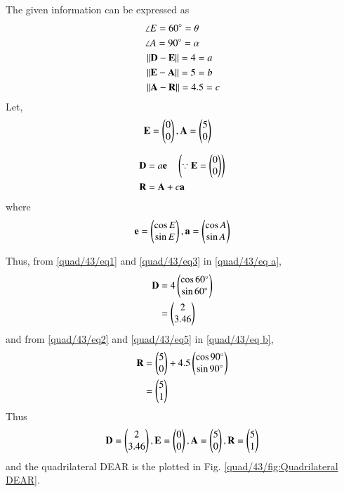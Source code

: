 The given information can be expressed as
    \begin{align}
    &\angle E= 60\degree=\theta \label{quad/43/eq1}
    \\
    &\angle A= 90\degree=\alpha \label{quad/43/eq2}
    \\
    &\left\lVert\mathbf{D}-\mathbf{E}\right\rVert =4=a \label{quad/43/eq3}
    \\
    &\left\lVert\mathbf{E}-\mathbf{A}\right\rVert =5=b \label{quad/43/eq4}
    \\
     &\left\lVert\mathbf{A}-\mathbf{R}\right\rVert =4.5=c \label{quad/43/eq5}
    \end{align}
 Let, \begin{align}
    &\mathbf{E}=\begin{pmatrix}0\\0\end{pmatrix}, \mathbf{A}=\begin{pmatrix}5\\0\end{pmatrix}
\end{align}

\begin{lemma}
\label{quad/43/lemma}
\begin{align}
  & \mathbf{D} = a\mathbf{e}  \quad \left(\because \mathbf{E}=\begin{pmatrix}0\\0\end{pmatrix}\right) \label{quad/43/eq a}
\\
  & \mathbf{R} =\mathbf{A} + c\mathbf{a} \label{quad/43/eq b}
\end{align}
where 
\begin{align}
\mathbf{e} = \begin{pmatrix}\cos E \\\sin E \end{pmatrix} ,\mathbf{a} = \begin{pmatrix}\cos A\\\sin A \end{pmatrix}
\end{align}
\end{lemma}
Thus, 
from  \eqref{quad/43/eq1} and \eqref{quad/43/eq3} in \eqref{quad/43/eq a},
\begin{align}
\mathbf{D}&=4\begin{pmatrix}\cos 60\degree \\\sin 60\degree \end{pmatrix}
\\
&=\begin{pmatrix}2\\3.46\end{pmatrix}
\end{align}
and from \eqref{quad/43/eq2} and \eqref{quad/43/eq5} in \eqref{quad/43/eq b},
\begin{align}
\mathbf{R} &=\begin{pmatrix}5\\0\end{pmatrix} + 4.5\begin{pmatrix}\cos 90\degree \\\sin 90\degree \end{pmatrix}
\\
&=\begin{pmatrix}5\\1\end{pmatrix}
\end{align}
Thus 
\begin{align}
 \mathbf{D}=\begin{pmatrix}2\\3.46\end{pmatrix},\mathbf{E} = \begin{pmatrix}0\\0\end{pmatrix}, \mathbf{A}=\begin{pmatrix}5\\0\end{pmatrix},\mathbf{R}=\begin{pmatrix}5\\1\end{pmatrix}
\end{align}
and the quadrilateral DEAR is the plotted in Fig. \ref{quad/43/fig:Quadrilateral DEAR}.	

